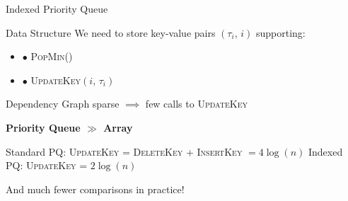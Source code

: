 \documentclass{beamer}
\begin{document}
\begin{frame}{Indexed Priority Queue}
  \begin{block}{Data Structure}
    We need to store key-value pairs $\left(\tau_i,\, i\right)$ supporting:
    \begin{itemize}
    \item $\bullet$ \textsc{PopMin}()
    \item $\bullet$ \textsc{UpdateKey}$\left(i, \, \tau_i\right)$
    \end{itemize}
  \end{block}
  \vspace{5pt}
  Dependency Graph sparse $\implies$ few calls to \textsc{UpdateKey}
  \begin{center}
    \textbf{Priority Queue $\pmb{\gg}$ Array}
  \end{center}
  Standard PQ: \textsc{UpdateKey} = \textsc{DeleteKey} + \textsc{InsertKey} $= 4\log(n)$
  Indexed PQ: \textsc{UpdateKey} = $2\log(n)$ \\
  \begin{center}
    And much fewer comparisons in practice!
  \end{center}

\end{frame}
\end{document}
